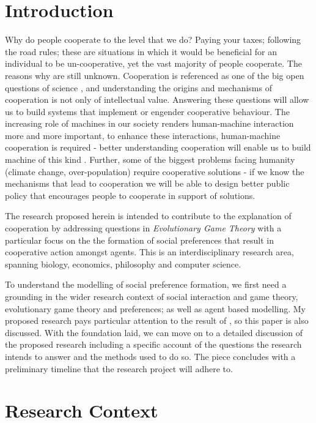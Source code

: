 \documentclass[11pt]{article}
\newcommand*{\np}{\par\noindent\newline}
\begin{document}
\newpage
\tableofcontents
\newpage
\section{Introduction}\label{intro}
Why do people cooperate to the level that we do? Paying your taxes; following
the road rules; these are situations in which it would be beneficial for an
individual to be un-cooperative, yet the vast majority of people cooperate. The
reasons why are still unknown. Cooperation is referenced as one of the big open
questions of science \cite{pennisi_how_2005}, and understanding the origins and
mechanisms of cooperation is not only of intellectual value. Answering these
questions will allow us to build systems that implement or engender cooperative
behaviour. The increasing role of machines in our society renders human-machine
interaction more and more important, to enhance these interactions,
human-machine cooperation is required - better understanding cooperation will
enable us to build machine of this kind \cite{hoc_human_2000}. Further, some of
the biggest problems facing humanity (climate change, over-population) require
cooperative solutions - if we know the mechanisms that lead to cooperation we
will be able to design better public policy that encourages people to cooperate in support of solutions.

\np The research proposed herein is intended to contribute to the explanation
of cooperation by addressing questions in \textit{Evolutionary Game Theory}
with a particular focus on the the formation of social preferences that result
in cooperative action amongst agents. This is an interdisciplinary research
area, spanning biology, economics, philosophy and computer science.

\np To understand the modelling of social preference formation, we first need
a grounding in the wider research context of social interaction and game
theory, evolutionary game theory and preferences; as well as agent based
modelling. My proposed research pays particular attention to the result of
\cite{alger_homo_2013}, so this paper is also discussed. With the foundation
laid, we can move on to a detailed discussion of the proposed research
including a specific account of the questions the research intends to answer
and the methods used to do so. The piece concludes with a preliminary timeline that the research project will adhere to.
\section{Research Context}
\end{document}
